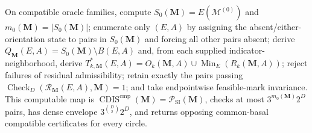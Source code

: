 On compatible oracle families, compute \(S_0(\mathbf M)=E(\mathcal M^{(0)})\) and \(m_0(\mathbf M)=|S_0(\mathbf M)|\); enumerate only \((E,A)\) by assigning the absent/either-orientation state to pairs in \(S_0(\mathbf M)\) and forcing all other pairs absent; derive \(Q_{\mathbf M}(E,A)=S_0(\mathbf M)\setminus B(E,A)\) and, from each supplied indicator-neighborhood, derive \(T^*_{k,\mathbf M}(E,A)=O_k(\mathbf M,A)\cup\operatorname{Min}_E(R_k(\mathbf M,A))\); reject failures of residual admissibility; retain exactly the pairs passing \(\operatorname{Check}_{D}(\mathcal R_{\mathbf M}(E,A),\mathbf M)=1\); and take endpointwise feasible-mark invariance.  This computable map is \(\operatorname{CDIS}^{\mathrm{cmp}}(\mathbf M)=\mathcal P_{\mathrm{SI}}(\mathbf M)\), checks at most \(3^{m_0(\mathbf M)}2^D\) pairs, has dense envelope \(3^{\binom D2}2^D\), and returns opposing common-basal compatible certificates for every circle.